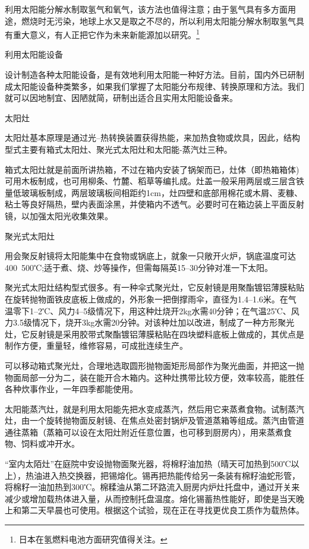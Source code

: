 \documentclass{ctexbook}
\begin{document}
利用太阳能分解水制取氢气和氧气，该方法也值得注意；由于氢气具有多方面用途，燃烧时无污染，地球上水又是取之不尽的，所以利用太阳能分解水制取氢气具有重大意义，有人正把它作为未来新能源加以研究。\footnote{日本在氢燃料电池方面研究值得关注。}

利用太阳能设备

设计制造各种太阳能设备，是有效地利用太阳能一种好方法。目前，国内外已研制成太阳能设备种类繁多，如果我们掌握了太阳能分布规律、转换原理和方法。我们就可以因地制宜、因陋就简，研制出适合且实用太阳能设备来。

太阳灶

太阳灶基本原理是通过光--热转换装置获得热能，来加热食物或炊具，因此，结构型式主要有箱式太阳灶、聚光式太阳灶和太阳能-蒸汽灶三种。

箱式太阳灶就是前面所讲热箱，不过在箱内安装了锅架而已，灶体（即热箱箱体)可用木板制成，也可用柳条、竹麓、稻草等编扎成。灶盖一般采用两层或三层含铁量低玻璃板制成，两层玻璃板间相距约1cm，灶四壁和底部用棉花或木屑、麦糠、粘土等良好隔热，壁内表面涂黑，并使箱内不透气。必要时可在箱边装上平面反射镜，以加强太阳光收集效果。

聚光式太阳灶

用会聚反射镜将太阳能集中在食物或锅底上，就象一只敞开火炉，锅底温度可达400~500℃;适于煮、烧、炒等操作，但需每隔英15--30分钟对准一下太阳。

聚光式太阳灶结构型式很多。有一种伞式聚光灶，它反射镜是用聚酯镀铝薄膜粘贴在旋转抛物面铁皮底板上做成的，外形象一把倒撑雨伞，直径为1.4--1.6米。在气温零下1--2℃、风力4--5级情况下，用这种灶烧开2kg水需40分钟；在气温25℃、风力3.5级情况下，烧开3kg水需20分钟。对该种灶加以改进，制成了一种方形聚光灶，它反射镜是采用胶带式聚酯镀铝薄膜粘贴在四块塑料底板上做成的，其优点是制作方便，重量轻，维修容易，可成批连续生产。

可以移动箱式聚光灶，合理地选取圆形抛物面矩形局部作为聚光曲面，并把这一抛物面局部一分为二，装在能开合木箱内。这种灶携带比较方便，效率较高，能胜任各种炊事作业，一年四季都能使用。

太阳能蒸汽灶，就是利用太阳能先把水变成蒸汽，然后用它来蒸煮食物。试制蒸汽灶，由一个旋转抛物面反射镜、在焦点处密封锅炉及管道蒸箱等组成。蒸汽由管道通往蒸箱（蒸箱可以设在太阳灶附近任意位置，也可移到厨房内），用来蒸煮食物、饲料或冲开水。


“室内太陌灶”在庭院中安设抛物面聚光器，将棉籽油加热（晴天可加热到500℃以上），热油进入热交换器，把锡熔化。锡再把热能传给另一条装有棉籽油蛇形管，将棉籽一油加热到300℃。棉糅油从第二环路流入厨房内炉灶托盘中，通过开关来减少或增加载热体进入量，从而控制托盘温度。熔化锡蓄热性能好，即使是当天晚上和第二天早晨也可使用。根据这个试验，现在正在寻找更优良工质作为载热体。
\end{document}

